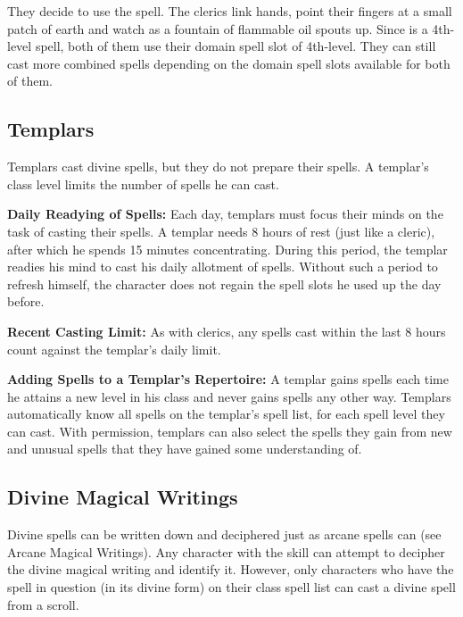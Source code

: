 They decide to use the  spell. The clerics link hands, point their fingers at a small patch of earth and watch as a fountain of flammable oil spouts up. Since  is a 4th-level spell, both of them use their domain spell slot of 4th-level. They can still cast more combined spells depending on the domain spell slots available for both of them.

\subsection{Templars}
Templars cast divine spells, but they do not prepare their spells. A templar's class level limits the number of spells he can cast. %

\textbf{Daily Readying of Spells:} Each day, templars must focus their minds on the task of casting their spells. A templar needs 8 hours of rest (just like a cleric), after which he spends 15 minutes concentrating. During this period, the templar readies his mind to cast his daily allotment of spells. Without such a period to refresh himself, the character does not regain the spell slots he used up the day before.

\textbf{Recent Casting Limit:} As with clerics, any spells cast within the last 8 hours count against the templar's daily limit.

\textbf{Adding Spells to a Templar's Repertoire:} A templar gains spells each time he attains a new level in his class and never gains spells any other way. Templars automatically know all spells on the templar's spell list, for each spell level they can cast. With permission, templars can also select the spells they gain from new and unusual spells that they have gained some understanding of.

\subsection{Divine Magical Writings}
Divine spells can be written down and deciphered just as arcane spells can (see Arcane Magical Writings). Any character with the  skill can attempt to decipher the divine magical writing and identify it. However, only characters who have the spell in question (in its divine form) on their class spell list can cast a divine spell from a scroll.

